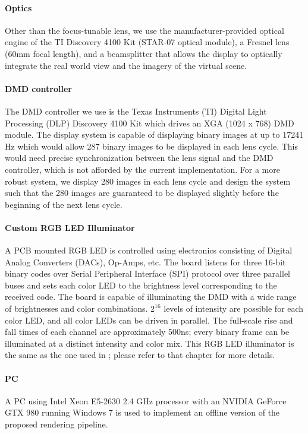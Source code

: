 \paragraph{Optics} Other than the focus-tunable lens, we use the manufacturer-provided optical engine of the TI Discovery 4100 Kit (STAR-07 optical module), a Fresnel lens (60mm focal length), and a beamsplitter that allows the display to optically integrate the real world view and the imagery of the virtual scene. 

\paragraph{DMD controller} 
The DMD controller we use is the Texas Instruments (TI) Digital Light Processing (DLP) Discovery 4100 Kit which drives an XGA (1024 x 768) DMD module. The display system is capable of displaying binary images at up to 17241 Hz which would allow 287 binary images to be displayed in each lens cycle. This would need precise synchronization between the lens signal and the DMD controller, which is not afforded by the current implementation. For a more robust system, we display 280 images in each lens cycle and design the system such that the 280 images are guaranteed to be displayed slightly before the beginning of the next lens cycle. 

\paragraph{Custom RGB LED Illuminator}
A PCB mounted RGB LED is controlled using electronics consisting of Digital Analog Converters (DACs), Op-Amps, etc. The board listens for three 16-bit binary codes over Serial Peripheral Interface (SPI) protocol over three parallel buses and sets each color LED to the brightness level corresponding to the received code. The board is capable of illuminating the DMD with a wide range of brightnesses and color combinations. $2^{16}$ levels of intensity are possible for each color LED, and all color LEDs can be driven in parallel. The full-scale rise and fall times of each channel are approximately 500ns; every binary frame can be illuminated at a distinct intensity and color mix. This RGB LED illuminator is the same as the one used in \citet{Lincoln2017scene}; please refer to that chapter for more details. 

\paragraph{PC}
A PC using Intel Xeon E5-2630 2.4 GHz processor with an NVIDIA GeForce GTX 980 running Windows 7 is used to implement an offline version of the proposed rendering pipeline. 

